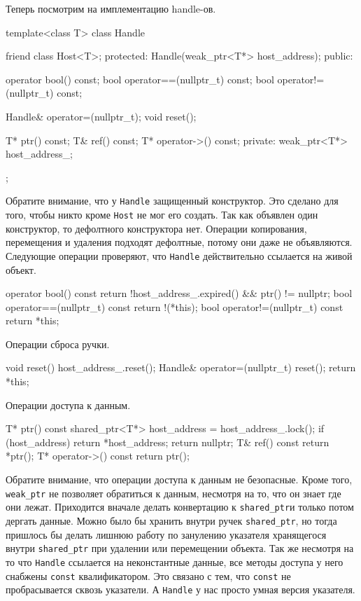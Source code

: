 Теперь посмотрим на имплементацию handle-ов.
\begin{cppcode}
template<class T>
class Handle {
  friend class Host<T>;
protected:
  Handle(weak_ptr<T*> host_address);
public:

  operator bool() const;
  bool operator==(nullptr_t) const;
  bool operator!=(nullptr_t) const;
  
  Handle& operator=(nullptr_t);
  void reset();
    
  T* ptr() const;
  T& ref() const;
  T* operator->() const;
private:
  weak_ptr<T*> host_address_;
};
\end{cppcode}
Обратите внимание, что у \verb"Handle" защищенный конструктор.
Это сделано для того, чтобы никто кроме \verb"Host" не мог его создать.
Так как объявлен один конструктор, то дефолтного конструктора нет.
Операции копирования, перемещения и удаления подходят дефолтные, потому они даже не объявляются.
Следующие операции проверяют, что \verb"Handle" действительно ссылается на живой объект.
\begin{cppcode}
operator bool() const {
  return !host_address_.expired() && ptr() != nullptr;
}
bool operator==(nullptr_t) const {
  return !(*this);
}
bool operator!=(nullptr_t) const {
  return *this;
}
\end{cppcode}
Операции сброса ручки.
\begin{cppcode}
void reset() {
  host_address_.reset();
}
Handle& operator=(nullptr_t) {
  reset();
  return *this;
}
\end{cppcode}
Операции доступа к данным.
\begin{cppcode}
T* ptr() const {
  shared_ptr<T*> host_address = host_address_.lock();
  if (host_address)
    return *host_address;
  return nullptr;
}
T& ref() const {
  return *ptr();
}
T* operator->() const {
  return ptr();
}
\end{cppcode}
Обратите внимание, что операции доступа к данным не безопасные.
Кроме того, \verb"weak_ptr" не позволяет обратиться к данным, несмотря на то, что он знает где они лежат.
Приходится вначале делать конвертацию к \verb"shared_ptr"и только потом дергать данные.
Можно было бы хранить внутри ручек \verb"shared_ptr", но тогда пришлось бы делать лишнюю работу по занулению указателя хранящегося внутри \verb"shared_ptr" при удалении или перемещении объекта.
Так же несмотря на то что \verb"Handle"  ссылается на неконстантные данные, все методы доступа у него снабжены \verb"const" квалификатором.
Это связано с тем, что \verb"const" не пробрасывается сквозь указатели.
А \verb"Handle" у нас просто умная версия указателя.

